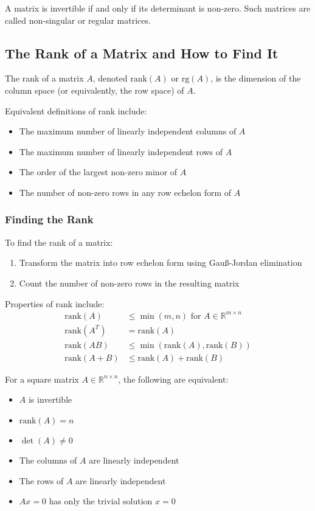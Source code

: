 A matrix is invertible if and only if its determinant is non-zero. Such matrices are called non-singular or regular matrices.

\subsection{The Rank of a Matrix and How to Find It}

The rank of a matrix $A$, denoted $\text{rank}(A)$ or $\text{rg}(A)$, is the dimension of the column space (or equivalently, the row space) of $A$.

Equivalent definitions of rank include:
\begin{itemize}[label=$-$]
    \item The maximum number of linearly independent columns of $A$
    \item The maximum number of linearly independent rows of $A$
    \item The order of the largest non-zero minor of $A$
    \item The number of non-zero rows in any row echelon form of $A$
\end{itemize}

\subsubsection{Finding the Rank}
To find the rank of a matrix:
\begin{enumerate}
    \item Transform the matrix into row echelon form using Gauß-Jordan elimination
    \item Count the number of non-zero rows in the resulting matrix
\end{enumerate}

Properties of rank include:
\begin{align*}
\text{rank}(A) &\leq \min(m,n) \text{ for } A \in \mathbb{R}^{m \times n} \\
\text{rank}(A^T) &= \text{rank}(A) \\
\text{rank}(AB) &\leq \min(\text{rank}(A), \text{rank}(B)) \\
\text{rank}(A+B) &\leq \text{rank}(A) + \text{rank}(B)
\end{align*}

For a square matrix $A \in \mathbb{R}^{n \times n}$, the following are equivalent:
\begin{itemize}[label=$-$]
    \item $A$ is invertible
    \item $\text{rank}(A) = n$
    \item $\det(A) \neq 0$
    \item The columns of $A$ are linearly independent
    \item The rows of $A$ are linearly independent
    \item $Ax = 0$ has only the trivial solution $x = 0$
\end{itemize}


